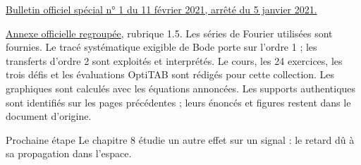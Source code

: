 \href{https://www.education.gouv.fr/bo/21/Special1/ESRS2035779A.htm}{Bulletin officiel spécial n° 1 du 11 février 2021, arrêté du 5 janvier 2021.}\par
\href{https://cache.media.education.gouv.fr/file/SPE1-MEN-MESRI-4-2-2021/64/8/spe779_annexe_1373648.pdf}{Annexe officielle regroupée}, rubrique 1.5. Les séries de Fourier utilisées sont fournies. Le tracé systématique exigible de Bode porte sur l’ordre 1 ; les transferts d’ordre 2 sont exploités et interprétés.
Le cours, les 24 exercices, les trois défis et les évaluations OptiTAB sont rédigés pour cette collection. Les graphiques sont calculés avec les équations annoncées. Les supports authentiques sont identifiés sur les pages précédentes ; leurs énoncés et figures restent dans le document d’origine.
\begin{methode}{Prochaine étape}
Le chapitre 8 étudie un autre effet sur un signal : le retard dû à sa propagation dans l’espace.
\end{methode}

